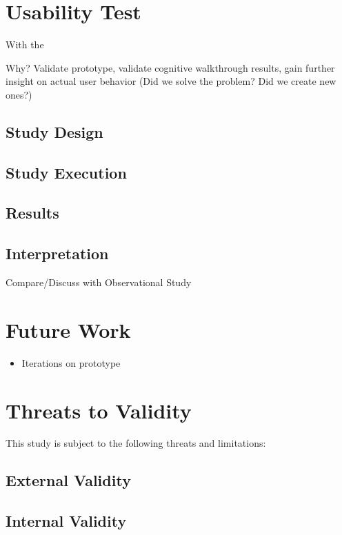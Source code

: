 \documentclass[sigplan,screen,nonacm,review]{acmart}
\begin{document}
\section{Usability Test}



With the

Why? Validate prototype, validate cognitive walkthrough results, gain further insight on actual user behavior (Did we solve the problem? Did we create new ones?)

\subsection{Study Design}


\subsection{Study Execution}



\subsection{Results}

\subsection{Interpretation}
Compare/Discuss with Observational Study

\section{Future Work}
\label{sec:future}

\begin{itemize}
	\item Iterations on prototype
\end{itemize}

\section{Threats to Validity}
\label{sec:threats}

This study is subject to the following threats and limitations:

\subsection{External Validity}

\subsection{Internal Validity}
\end{document}
